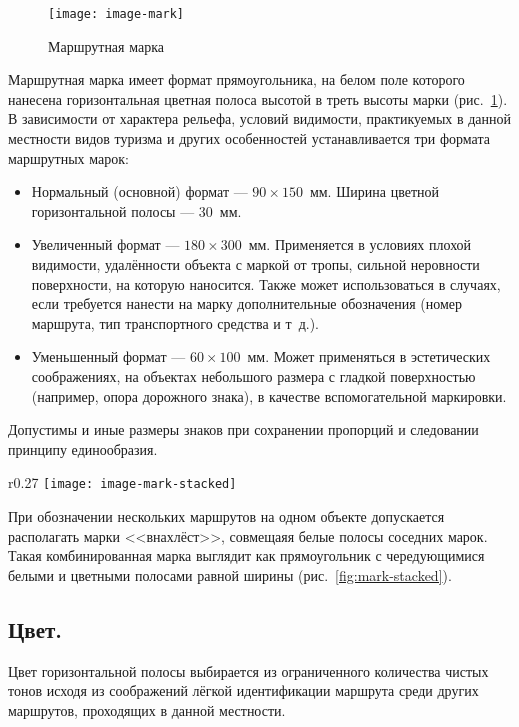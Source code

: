 \documentclass[a4paper,12pt]{extarticle}
\begin{document}
\begin{figure}
	\centering
	\texttt{[image: image-mark]}
	\caption{Маршрутная марка}\label{fig:mark}
\end{figure}

Маршрутная марка имеет формат прямоугольника, на белом поле которого нанесена горизонтальная цветная полоса высотой в
треть высоты марки (рис.~\ref{fig:mark}). В зависимости от характера рельефа, условий видимости, практикуемых в данной
местности видов туризма и других особенностей устанавливается три формата маршрутных марок:
\begin{itemize}
	\item Нормальный (основной) формат --- $90\times150$~мм. Ширина цветной горизонтальной полосы --- 30~мм.
	\item Увеличенный формат --- $180\times300$~мм. Применяется в условиях плохой видимости, удалённости объекта с маркой от
тропы, сильной неровности поверхности, на которую наносится. Также может использоваться в случаях, если требуется
нанести на марку дополнительные обозначения (номер маршрута, тип транспортного средства и т~д.).
\item Уменьшенный формат --- $60\times100$~мм. Может применяться в эстетических соображениях, на объектах небольшого размера с
гладкой поверхностью (например, опора дорожного знака), в качестве вспомогательной маркировки.
\end{itemize}

Допустимы и иные размеры знаков при сохранении пропорций и следовании принципу единообразия.

\begin{wrapfigure}{r}{0.27\textwidth}
	\centering
	\texttt{[image: image-mark-stacked]}
	\caption{Комбинированная маршрутная марка}\label{fig:mark-stacked}
\end{wrapfigure}

При обозначении нескольких маршрутов на одном объекте допускается располагать марки <<внахлёст>>, совмещаяя белые полосы
соседних марок. Такая комбинированная марка выглядит как прямоугольник с чередующимися белыми и цветными полосами равной
ширины (рис.~\ref{fig:mark-stacked}).

\subsection{Цвет.}
Цвет горизонтальной полосы выбирается из ограниченного количества чистых тонов исходя из соображений лёгкой
идентификации маршрута среди других маршрутов, проходящих в данной местности.
\end{document}
